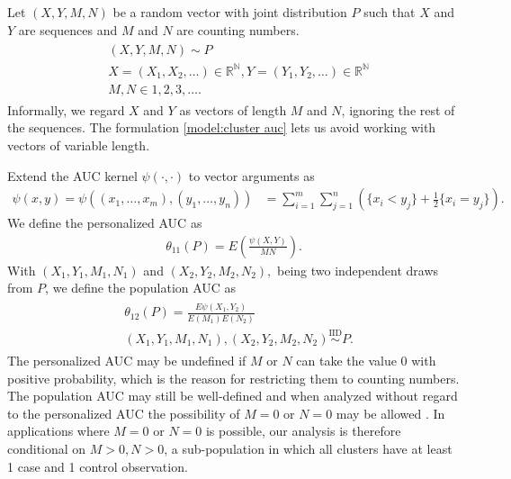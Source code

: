 \documentclass[12pt]{article}
\DeclareMathOperator{\AUC}{AUC}
\newcommand{\E}{E}
\renewcommand{\P}{P}
\newcommand{\cind}{\perp \!\!\! \perp}
\newcommand{\aucindiv}{\theta_{11}}%
\newcommand{\aucpop}{\theta_{12}}%
\newcommand{\kernel}{\psi}
\begin{document}
Let $(X,Y,M,N)$ be a random vector
with joint distribution $\P$  such that $X$ and $Y$ are sequences and $M$ and $N$ are counting numbers.%
\begin{gather}
\begin{aligned}\label{model:cluster auc}
  &(X,Y,M,N) \sim \P\\
  &X=(X_1,X_2,\ldots)\in\mathbb{R}^\mathbb{N}, Y=(Y_1,Y_2,\ldots)\in\mathbb{R}^\mathbb{N}\\
  &M,N \in 1,2,3,\ldots .
\end{aligned}
\end{gather}
Informally, we regard $X$ and $Y$ as vectors of length $M$ and $N$, ignoring the rest of the sequences. The formulation \eqref{model:cluster auc} lets us avoid working with vectors of variable length.

Extend the AUC kernel $\kernel(\cdot, \cdot)$ to vector arguments as
\begin{align}
  \kernel(x,y)=\kernel((x_1,\ldots,x_m),(y_1,\ldots,y_n))&=\sum_{i=1}^m\sum_{j=1}^n\left(\{x_i<y_j\}+\frac{1}{2}\{x_i=y_j\}\right).\label{defn:auc kernel}
\end{align}
We define the personalized AUC as
\begin{align}
  \aucindiv(\P)=\E\left(\frac{\psi(X,Y)}{MN} \right).
  \label{defn:aucindiv}
\end{align}
With $(X_1,Y_1,M_1,N_1)$ and $(X_2,Y_2,M_2,N_2),$ being two independent draws from $P$, we define the population AUC as
\begin{gather}
  \begin{aligned}
  &\aucpop(\P)=\frac{\E\psi(X_1,Y_2)}{\E(M_1)\E(N_2)}\label{defn:aucpop}\\
  &(X_1,Y_1,M_1,N_1),(X_2,Y_2,M_2,N_2) \overset{\text{IID}}{\sim} \P.
\end{aligned}
\end{gather}
The personalized AUC may be undefined if $M$ or $N$ can take the value
$0$ with positive probability, which is the reason for restricting
them to counting numbers. The population AUC may still be well-defined
and when analyzed without regard to the personalized AUC the possibility
of $M=0$ or $N=0$ may be allowed \citep{obuchowski1997}. In
applications where $M=0$ or $N=0$ is possible, our analysis is
therefore conditional on $M>0,N>0$, a sub-population in which all
clusters have at least 1 case and 1 control observation.
\end{document}

